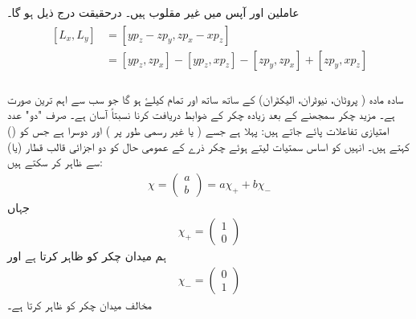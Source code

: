 عاملین  اور  آپس میں غیر مقلوب  ہیں۔ درحقیقت درج ذیل ہو گا۔
\begin{gather}
\begin{aligned}
[L_{x},L_{y}]&=[yp_{z}-zp_{y},zp_{x}-xp_{z}]\\
&=[yp_{z},zp_{x}]-[yp_{z},xp_{z}]-[zp_{y},zp_{x}]+[zp_{y},xp_{z}]\\
\end{aligned}
\end{gather}



سادہ مادہ ( پروٹان،  نیوٹران،  الیکٹران)  کے ساتھ ساتھ   اور تمام   کیلۓ    ہو گا جو سب سے اہم ترین صورت ہے۔ مزید چکر سمجھنے کے بعد زیادہ چکر کے ضوابط  دریافت کرنا نسبتاً   آسان ہے۔  صرف "دو"   عدد امتیازی تفاعلات  پائے جاتے ہیں:  پہلا   ہے جسے   ( یا غیر رسمی طور پر  ) اور دوسرا  ہے جس کو   () کہتے ہیں۔ انہیں کو  اساس سمتیات لیتے   ہوئے     چکر ذرے  کے عمومی حال کو دو اجزائی قالب قطار   (یا) سے ظاہر کر سکتے ہیں:
\begin{align}\label{مساوات_تین_بعدی_عمومی_حال_چائے}
 \chi=\begin{pmatrix} a \\ b \end{pmatrix}= a\chi_{+} + b\chi_{-} 
 \end{align}
جہاں
\begin{align} 
 \chi_{+}=\begin{pmatrix}1\\0 \end{pmatrix}
 \end{align}
ہم میدان چکر  کو ظاہر کرتا ہے اور  
\begin{align} 
 \chi_{-}=\begin{pmatrix}0 \\1 \end{pmatrix}
 \end{align}
مخالف میدان چکر کو ظاہر کرتا ہے۔


